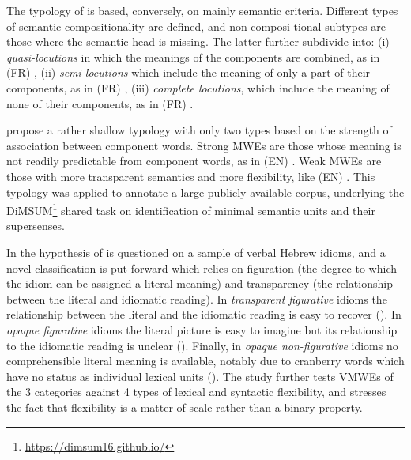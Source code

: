 \documentclass[output=paper,
modfonts,
]{langscibook}
\begin{document}
The typology of \citet{Melcuk10} is based, conversely, on mainly semantic criteria. Different types of semantic compositionality are defined, and non-composi-tional subtypes are those where the semantic head is missing. The latter further subdivide into: (i) \emph{quasi-locutions} in which the meanings of the components are combined, as in (FR) , (ii) \emph{semi-locutions} which include the meaning of only a part of their components, as in (FR) , (iii) \emph{complete locutions}, which include the meaning of none of their components, as in (FR) .

\citet{schneider2014} propose a rather shallow typology with only two types based on the strength of association between component words. Strong MWEs are those whose meaning is not readily predictable from component words, as in (EN) . Weak MWEs are those with more transparent semantics and more flexibility, like (EN) . This typology was applied to annotate a large publicly available corpus, underlying the DiMSUM\footnote{\url{https://dimsum16.github.io/}} shared task on identification of minimal semantic units and their supersenses.

In \citet{Sheinfux17} the  hypothesis of \citet{nunberg-94} is questioned on a sample of verbal Hebrew idioms, and a novel classification is put forward which relies on figuration (the degree to which the idiom can be assigned a literal meaning) and transparency (the relationship between the literal and idiomatic reading). In \emph{transparent figurative} idioms the relationship between the literal and the idiomatic reading is easy to recover (). In \emph{opaque figurative} idioms the literal picture is easy to imagine but its relationship to the idiomatic reading is unclear (). Finally, in \emph{opaque non-figurative} idioms no comprehensible literal meaning is available, notably due to cranberry words which have no status as individual lexical units (). The study further tests VMWEs of the 3 categories against 4 types of lexical and syntactic flexibility, and stresses the fact that flexibility is a matter of scale rather than a binary property.
\end{document}
